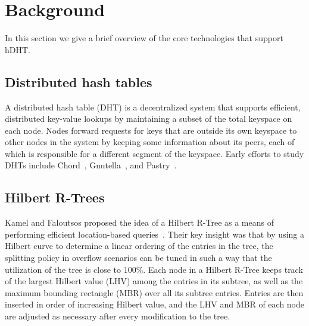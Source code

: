 \section{Background} \label{section:background}
In this section we give a brief overview of the core technologies that support hDHT.

\subsection{Distributed hash tables}
A distributed hash table (DHT) is a decentralized system that supports efficient, distributed key-value lookups by maintaining a subset of the total keyspace on each node. Nodes forward requests for keys that are outside its own keyspace to other nodes in the system by keeping some information about its peers, each of which is responsible for a different segment of the keyspace. Early efforts to study DHTs include Chord~\cite{stoica2001chord}, Gnutella~\cite{}, and Pastry~\cite{rowstron2001pastry}.

\subsection{Hilbert R-Trees}
Kamel and Faloutsos proposed the idea of a Hilbert R-Tree as a means of performing efficient location-based queries~\cite{kamel1993hilbert}. Their key insight was that by using a Hilbert curve to determine a linear ordering of the entries in the tree, the splitting policy in overflow scenarios can be tuned in such a way that the utilization of the tree is close to 100\%. Each node in a Hilbert R-Tree keeps track of the largest Hilbert value (LHV) among the entries in its subtree, as well as the maximum bounding rectangle (MBR) over all its subtree entries. Entries are then inserted in order of increasing Hilbert value, and the LHV and MBR of each node are adjusted as necessary after every modification to the tree.